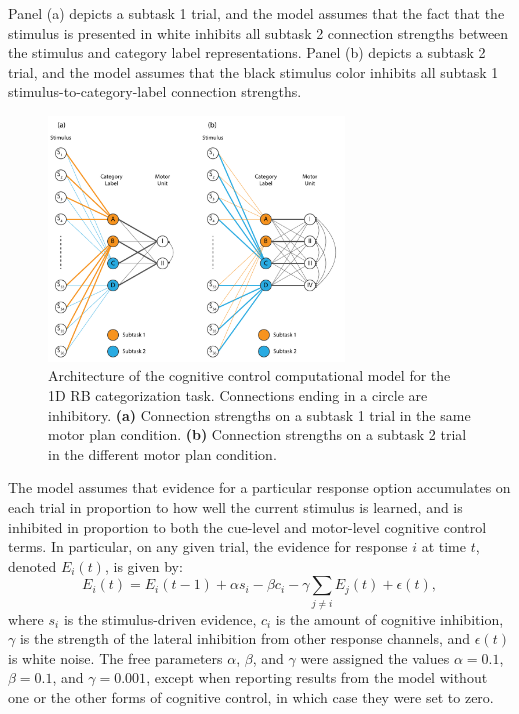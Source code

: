 \documentclass[doc, floatsintext]{apa7}
\begin{document}
Panel (a) depicts a subtask 1 trial, and the model assumes
that the fact that the stimulus is presented in white
inhibits all subtask 2 connection strengths between the
stimulus and category label representations. Panel (b)
depicts a subtask 2 trial, and the model assumes that the
black stimulus color inhibits all subtask 1
stimulus-to-category-label connection strengths.  

\begin{figure}[h!]
    \centering
    \includegraphics[width=0.7\textwidth]{../figures/fig_2.pdf}
    \caption{
        Architecture of the cognitive control computational
        model for the 1D RB categorization task. Connections
        ending in a circle are inhibitory. \textbf{(a)}
        Connection strengths on a subtask 1 trial in the same
        motor plan condition. \textbf{(b)} Connection strengths
        on a subtask 2 trial in the different motor plan
        condition.}
    \label{fig_2}
\end{figure}

The model assumes that evidence for a particular response
option accumulates on each trial in proportion to how well
the current stimulus is learned, and is inhibited in
proportion to both the cue-level and motor-level cognitive
control terms. In particular, on any given trial, the
evidence for response $i$ at time $t$, denoted  $E_i(t)$, is
given by:
\begin{equation}
    E_i(t) = E_i(t-1) + \alpha s_i - \beta c_i - \gamma \sum_{j \neq i} E_{j}(t) + \epsilon (t),
    \label{diffusion_model}
\end{equation}
where $s_i$ is the stimulus-driven evidence, $c_i$ is the
amount of cognitive inhibition, $\gamma$ is the strength of
the lateral inhibition from other response channels, and
$\epsilon (t)$ is white noise. The free parameters $\alpha$,
$\beta$, and $\gamma$ were assigned the values $\alpha=0.1$,
$\beta=0.1$, and $\gamma=0.001$, except when reporting
results from the model without one or the other forms of
cognitive control, in which case they were set to zero.
\end{document}
